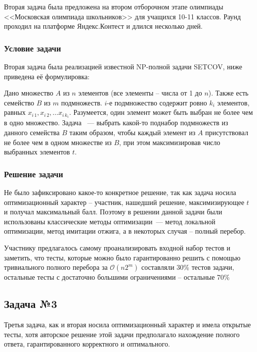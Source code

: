 \documentclass[a4paper]{article}
\begin{document}
Вторая задача была предложена на втором отборочном этапе олимпиады <<Московская олимпиада школьников>> для учащихся 10-11 классов. Раунд проходил на платформе Яндекс.Контест и длился несколько дней.

\subsubsection{Условие задачи}

Вторая задача была реализацией известной NP-полной задачи SETCOV, ниже приведена её формулировка:

Дано множество $A$ из $n$ элементов (все элементы -- числа от 1 до $n$). Также есть семейство $B$ из  $m$ подмножеств. $i$-е подмножество содержит ровно $k_i$ элементов, равных $x_{i\, 1}, x_{i\, 2}, \ldots x_{i\, k_i}$. Разумеется, один элемент может быть выбран не более чем в одно множество. Задача ~--- выбрать какой-то поднабор подмножеств из данного семейства $B$ таким образом, чтобы каждый элемент из $A$ присутствовал не более чем в одном множестве из $B$, при этом максимизировав число выбранных элементов $t$.


\subsubsection{Решение задачи}

Не было зафиксировано какое-то конкретное решение, так как задача носила оптимизационный характер -- участник, нашедший решение, максимизирующее $t$ и получал максимальный балл. Поэтому в решении данной задачи были использованы классические методы оптимизации~--- метод локальной оптимизации, метод имитации отжига, а в некоторых случая -- полный перебор.

Участнику предлагалось самому проанализировать входной набор тестов и заметить, что тесты, которые можно было гарантированно решить с помощью тривиального полного перебора за $\mathcal O(n2^m)$ составляли 30\% тестов задачи, остальные тесты с достаточно большими ограничениями -- остальные 70\%

\newpage
\subsection{Задача №3}

Третья задача, как и вторая носила оптимизационный характер и имела открытые тесты, хотя авторское решение этой задачи предполагало нахождение полного ответа, гарантированного корректного и оптимального.
\end{document}

